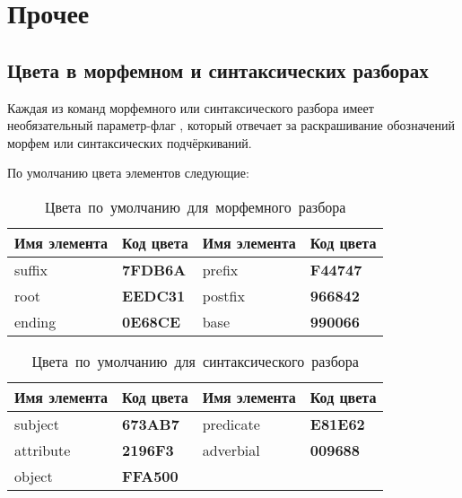 \section{Прочее}

\subsection{Цвета в морфемном и синтаксических разборах}

Каждая из команд морфемного или синтаксического разбора имеет необязательный
параметр-флаг \manKwargs[color], который отвечает за раскрашивание обозначений морфем
или синтаксических подчёркиваний.

По умолчанию цвета элементов следующие:


\renewcommand{\arraystretch}{1.125}
\begin{table}[ht!]
    \centering
    \small
    \begin{tabular}{@{}llll@{}}
        \toprule
        Имя элемента & Код цвета & Имя элемента & Код цвета\\\midrule
suffix & { \color[HTML]{7FDB6A} \textbf{7FDB6A} } & prefix & { \color[HTML]{F44747} \textbf{F44747} }\\\midrule
root & { \color[HTML]{EEDC31} \textbf{EEDC31} } & postfix & { \color[HTML]{966842} \textbf{966842} }\\\midrule
ending & { \color[HTML]{0E68CE} \textbf{0E68CE} } & base & { \color[HTML]{990066} \textbf{990066} }
        \\\bottomrule
    \end{tabular}

    \caption{Цвета~по~умолчанию~для~морфемного~разбора}
\end{table}



\renewcommand{\arraystretch}{1.125}
\begin{table}[ht!]
    \centering
    \small
    \begin{tabular}{@{}llll@{}}
        \toprule
        Имя элемента & Код цвета & Имя элемента & Код цвета\\\midrule
subject & { \color[HTML]{673AB7} \textbf{673AB7} } & predicate & { \color[HTML]{E81E62} \textbf{E81E62} }\\\midrule
attribute & { \color[HTML]{2196F3} \textbf{2196F3} } & adverbial & { \color[HTML]{009688} \textbf{009688} }\\\midrule
object & { \color[HTML]{FFA500} \textbf{FFA500} }
        \\\bottomrule
    \end{tabular}

    \caption{Цвета~по~умолчанию~для~синтаксического~разбора}
\end{table}



